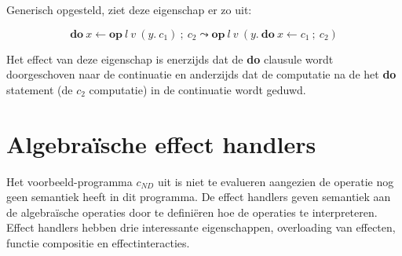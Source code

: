 Generisch opgesteld, ziet deze eigenschap er zo uit:

\begin{equation}
    \textbf{do}\:x \leftarrow \textbf{op}\:l\:v\:(y.\:c_{1})\:;\:c_{2} \leadsto  \textbf{op}\:l\:v\:(y.\: \textbf{do}\:x \leftarrow c_{1}\:;\:c_{2})
\end{equation}

Het effect van deze eigenschap is enerzijds dat de \textbf{do} clausule wordt doorgeschoven naar de continuatie en anderzijds dat de computatie na de het \textbf{do} statement (de $c_2$ computatie) in de continuatie wordt geduwd.

\section{Algebraïsche effect handlers}
Het voorbeeld-programma $c_{ND}$ uit is niet te evalueren aangezien de operatie nog geen semantiek heeft in dit programma.
De effect handlers geven semantiek aan de algebraïsche operaties door te definiëren hoe de operaties te interpreteren. Effect handlers hebben drie interessante eigenschappen, overloading van effecten, functie compositie en effectinteracties.

